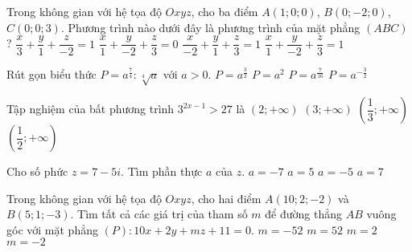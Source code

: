\begin{ex}%
	Trong không gian với hệ tọa độ $Oxyz$, cho ba điểm $A(1;0;0)$, $B(0;-2;0)$, $C(0;0;3)$. Phương trình nào dưới đây là phương trình của mặt phẳng $(ABC)$?
	\choice
	{$\dfrac{x}{3} +\dfrac{y}{1} +\dfrac{z}{-2} =1$}
	{$\dfrac{x}{1} +\dfrac{y}{-2} +\dfrac{z}{3} =0$}
	{$\dfrac{x}{-2} +\dfrac{y}{1} +\dfrac{z}{3} =1$}
	{\True $\dfrac{x}{1} +\dfrac{y}{-2} +\dfrac{z}{3} =1$}
\end{ex}

\begin{ex}%
	Rút gọn biểu thức $P=a^{\frac{7}{4}} : \sqrt[4]{a}$ với $a>0$.
	\choice
	{\True $P=a^{\frac{3}{2}}$}
	{$P=a^2$}
	{$P=a^{\frac{7}{16}}$}
	{$P=a^{-\frac{3}{2}}$}
\end{ex}

\begin{ex}%
	Tập nghiệm của bất phương trình $3^{2x-1}>27$ là
	\choice
	{\True $(2;+\infty)$}
	{$(3;+\infty)$}
	{$\left( \dfrac{1}{3};+\infty \right)$}
	{$\left( \dfrac{1}{2};+\infty \right)$}
\end{ex}

\begin{ex}%
	Cho số phức $z=7-5i$. Tìm phần thực $a$ của $z$.
	\choice
	{$a=-7$}
	{$a=5$}
	{$a=-5$}
	{\True $a=7$}
\end{ex}

\begin{ex}%
	Trong không gian với hệ tọa độ $Oxyz$, cho hai điểm $A(10;2;-2)$ và $B(5;1;-3)$. Tìm tất cả các giá trị của tham số $m$ để đường thẳng $AB$ vuông góc với mặt phẳng $(P) \colon 10x+2y+mz+11=0$.
	\choice
	{$m=-52$}
	{$m=52$}
	{\True $m=2$}
	{$m=-2$}
\end{ex}

